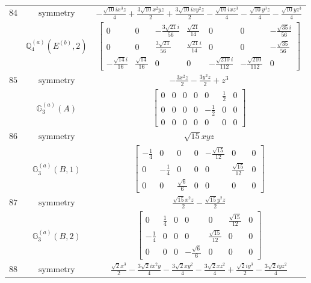 \documentclass[fleqn,8pt,landscape]{jsarticle}
\begin{document}
\begin{longtable}{ccc}
$ 84 $ & $ \text{symmetry} $ & $ - \frac{\sqrt{10} i x^{3} z}{4} + \frac{3 \sqrt{10} x^{2} y z}{2} + \frac{3 \sqrt{10} i x y^{2} z}{2} - \frac{\sqrt{10} i x z^{3}}{4} - \frac{\sqrt{10} y^{3} z}{4} - \frac{\sqrt{10} y z^{3}}{4} $ \\
$  $ & $ \mathbb{Q}_{4}^{(a)}(E^{(b)},2) $ & $ \begin{bmatrix} 0 & 0 & - \frac{3 \sqrt{21} i}{56} & \frac{\sqrt{21}}{14} & 0 & 0 & - \frac{\sqrt{35} i}{56} \\ 0 & 0 & \frac{3 \sqrt{21}}{56} & \frac{\sqrt{21} i}{14} & 0 & 0 & - \frac{\sqrt{35}}{56} \\ - \frac{\sqrt{14} i}{16} & \frac{\sqrt{14}}{16} & 0 & 0 & - \frac{\sqrt{210} i}{112} & - \frac{\sqrt{210}}{112} & 0 \end{bmatrix} $ \\ \hline
$ 85 $ & $ \text{symmetry} $ & $ - \frac{3 x^{2} z}{2} - \frac{3 y^{2} z}{2} + z^{3} $ \\
$  $ & $ \mathbb{G}_{3}^{(a)}(A) $ & $ \begin{bmatrix} 0 & 0 & 0 & 0 & 0 & \frac{1}{2} & 0 \\ 0 & 0 & 0 & 0 & - \frac{1}{2} & 0 & 0 \\ 0 & 0 & 0 & 0 & 0 & 0 & 0 \end{bmatrix} $ \\ \hline
$ 86 $ & $ \text{symmetry} $ & $ \sqrt{15} x y z $ \\
$  $ & $ \mathbb{G}_{3}^{(a)}(B,1) $ & $ \begin{bmatrix} - \frac{1}{4} & 0 & 0 & 0 & - \frac{\sqrt{15}}{12} & 0 & 0 \\ 0 & - \frac{1}{4} & 0 & 0 & 0 & \frac{\sqrt{15}}{12} & 0 \\ 0 & 0 & \frac{\sqrt{6}}{6} & 0 & 0 & 0 & 0 \end{bmatrix} $ \\ \hline
$ 87 $ & $ \text{symmetry} $ & $ \frac{\sqrt{15} x^{2} z}{2} - \frac{\sqrt{15} y^{2} z}{2} $ \\
$  $ & $ \mathbb{G}_{3}^{(a)}(B,2) $ & $ \begin{bmatrix} 0 & \frac{1}{4} & 0 & 0 & 0 & \frac{\sqrt{15}}{12} & 0 \\ - \frac{1}{4} & 0 & 0 & 0 & \frac{\sqrt{15}}{12} & 0 & 0 \\ 0 & 0 & 0 & - \frac{\sqrt{6}}{6} & 0 & 0 & 0 \end{bmatrix} $ \\ \hline
$ 88 $ & $ \text{symmetry} $ & $ \frac{\sqrt{2} x^{3}}{2} - \frac{3 \sqrt{2} i x^{2} y}{4} - \frac{3 \sqrt{2} x y^{2}}{4} - \frac{3 \sqrt{2} x z^{2}}{4} + \frac{\sqrt{2} i y^{3}}{2} - \frac{3 \sqrt{2} i y z^{2}}{4} $ \\

\end{longtable}
\end{document}
